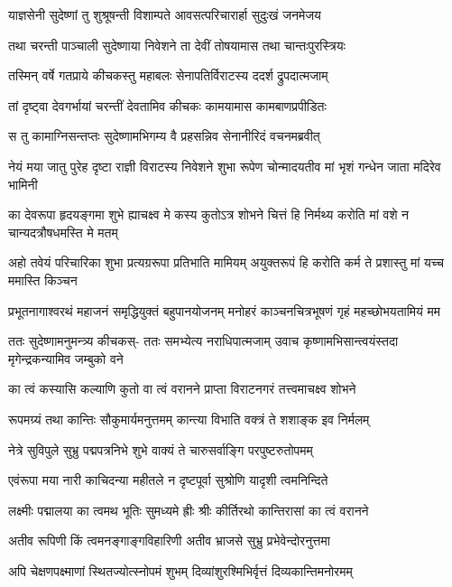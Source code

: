 \twolineshloka
{याज्ञसेनी सुदेष्णां तु शुश्रूषन्ती विशाम्पते}
{आवसत्परिचारार्हा सुदुःखं जनमेजय}


\twolineshloka
{तथा चरन्ती पाञ्चाली सुदेष्णाया निवेशने}
{ता देवीं तोषयामास तथा चान्तःपुरस्त्रियः}


\twolineshloka
{तस्मिन् वर्षे गतप्राये कीचकस्तु महाबलः}
{सेनापतिर्विराटस्य ददर्श द्रुपदात्मजाम्}


\twolineshloka
{तां दृष्ट्वा देवगर्भायां चरन्तीं देवतामिव}
{कीचकः कामयामास कामबाणप्रपीडितः}


\twolineshloka
{स तु कामाग्निसन्तप्तः सुदेष्णामभिगम्य वै}
{प्रहसन्निव सेनानीरिदं वचनमब्रवीत्}


\fourlineindentedshloka
{नेयं मया जातु पुरेह दृष्टा}
{राज्ञी विराटस्य निवेशने शुभा}
{रूपेण चोन्मादयतीव मां भृशं}
{गन्धेन जाता मदिरेव भामिनी}


\fourlineindentedshloka
{का देवरूपा हृदयङ्गमा शुभे}
{ह्याचक्ष्व मे कस्य कुतोऽत्र शोभने}
{चित्तं हि निर्मथ्य करोति मां वशे}
{न चान्यदत्रौषधमस्ति मे मतम्}


\fourlineindentedshloka
{अहो तवेयं परिचारिका शुभा}
{प्रत्यग्ररूपा प्रतिभाति मामियम्}
{अयुक्तरूपं हि करोति कर्म ते}
{प्रशास्तु मां यच्च ममास्ति किञ्चन}


\fourlineindentedshloka
{प्रभूतनागाश्वरथं महाजनं}
{समृद्धियुक्तं बहुपानयोजनम्}
{मनोहरं काञ्चनचित्रभूषणं}
{गृहं महच्छोभयतामियं मम}


\fourlineindentedshloka
{ततः सुदेष्णामनुमन्त्र्य कीचकस्-}
{ततः समभ्येत्य नराधिपात्मजाम्}
{उवाच कृष्णामभिसान्त्वयंस्तदा}
{मृगेन्द्रकन्यामिव जम्बुको वने}


\twolineshloka
{का त्वं कस्यासि कल्याणि कुतो वा त्वं वरानने}
{प्राप्ता विराटनगरं तत्त्वमाचक्ष्व शोभने}


\twolineshloka
{रूपमग्र्यं तथा कान्तिः सौकुमार्यमनुत्तमम्}
{कान्त्या विभाति वक्त्रं ते शशाङ्क इव निर्मलम्}


\twolineshloka
{नेत्रे सुविपुले सुभ्रु पद्मपत्रनिभे शुभे}
{वाक्यं ते चारुसर्वाङ्गि परपुष्टरुतोपमम्}


\twolineshloka
{एवंरूपा मया नारी काचिदन्या महीतले}
{न दृष्टपूर्वा सुश्रोणि यादृशी त्वमनिन्दिते}


\twolineshloka
{लक्ष्मीः पद्मालया का त्वमथ भूतिः सुमध्यमे}
{ह्रीः श्रीः कीर्तिरथो कान्तिरासां का त्वं वरानने}


\twolineshloka
{अतीव रूपिणी किं त्वमनङ्गाङ्गविहारिणी}
{अतीव भ्राजसे सुभ्रु प्रभेवेन्दोरनुत्तमा}


\twolineshloka
{अपि चेक्षणपक्ष्माणां स्थितज्योत्स्नोपमं शुभम्}
{दिव्यांशुरश्मिभिर्वृत्तं दिव्यकान्तिमनोरमम्}


